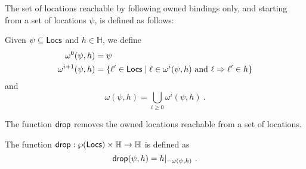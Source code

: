 The set of locations reachable by following owned bindings only, and starting from a set of locations $\psi$,
is defined as follows:
%
\begin{definition}
  Given $\psi\subseteq\mathsf{Locs}$ and $h\in\mathbb{H}$, we define
  \begin{align*}
  \omega^0(\psi,h)&=\psi\\ %
  \omega^{i+1}(\psi,h)&=\{\ell'\in\Locs\mid\ell\in\omega^i(\psi,h)\text{ and }\ell\Rightarrow\ell'\in h\}
  \end{align*}
  and
  \[
  \omega(\psi,h)=\bigcup\limits_{i\ge 0}\omega^i(\psi,h)~.
  \]
\end{definition}

The function $\mathsf{drop}$ removes the owned locations reachable from a set of locations.
%
\begin{definition}[Drop]\label{def:drop}
  The function $\mathsf{drop}:\wp(\mathsf{Locs})\times\mathbb{H}\to\mathbb{H}$ is defined as
  \[
  \mathsf{drop}(\psi,h)=h|_{-{\omega(\psi,h)}}~.
  \]
\end{definition}

